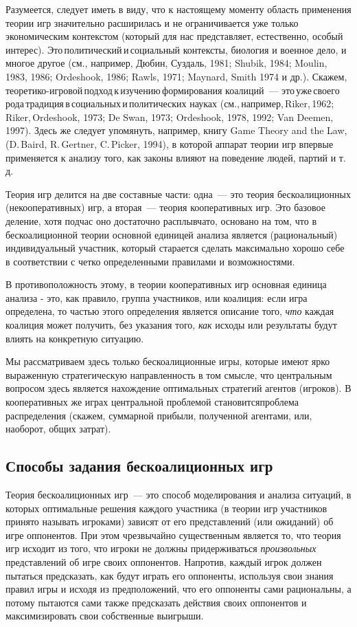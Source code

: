 \documentclass[12pt]{article}
\begin{document}
Разумеется, следует иметь в виду, что к настоящему моменту область
применения теории игр значительно расширилась и не ограничивается
уже только экономическим контекстом (который для нас представляет,
естественно, особый
интерес). Это\,политический\,и\,социальный контексты, биология и
военное дело, и многое другое (см., например, Дюбин, Суздаль, 1981;
Shubik, 1984; Moulin, 1983, 1986; Ordeshook, 1986; Rawls, 1971;
Maynard, Smith 1974 и др.).
Скажем,\,теоретико-игровой\,подход\,к\,изучению\,фор\-ми\-ро\-ва\-ния
коалиций~---
это\,уже\,своего\,рода\,традиция\,в\,социальных\,и\,по\-ли\-тических
науках (см.,\,например,\,Riker,\,1962;\,Riker,\,Or\-des\-hook, 1973;
De Swan, 1973; Or\-des\-hook, 1978, 1992; Van Deemen, 1997). Здесь
же следует упомянуть, например, книгу Game Theory and the Law,
(D.\,Baird, R.\,Gertner, C.\,Picker, 1994), в которой аппарат теории
игр впервые применяется к анализу того, как законы влияют на
поведение людей, партий и т.\,д.
\smallskip

Теория игр делится на две составные части: одна~--- это теория
бескоалиционных (некооперативных) игр, а вторая~--- теория
кооперативных игр. Это базовое деление, хотя подчас оно достаточно
расплывчато, основано на том, что в бескоалиционной теории основной
единицей анализа является (рациональный) индивидуальный участник,
который старается сделать максимально хорошо себе в соответствии с
четко определенными правилами и возможностями.

В противоположность этому, в теории кооперативных игр основная
единица анализа - это, как правило, группа участников, или коалиция:
если игра определена, то частью этого определения является описание
того, \emph{что} каждая коалиция может получить, без указания того,
\emph{как} исходы или результаты будут влиять на конкретную
ситуацию.

Мы рассматриваем здесь только бескоалиционные игры, которые имеют
ярко выраженную стратегическую направленность в том смысле, что
центральным вопросом здесь является нахождение оптимальных
стратегий агентов (игроков). В кооперативных же играх центральной
проблемой становитсяпроблема распределения (скажем, суммарной прибыли,
полученной агентами, или, наоборот, общих затрат).

\subsection{Способы задания бескоалиционных игр}


Теория бескоалиционных игр~--- это способ моделирования и анализа
ситуаций, в которых оптимальные решения каждого участника (в теории
игр участников принято называть  игроками) зависят от его
представлений (или ожиданий) об игре оппонентов. При этом чрезвычайно
существенным является то, что теория игр исходит из того, что
игроки не должны придерживаться
{\it произвольных} представлений об игре своих оппонентов. Напротив,
каждый игрок должен пытаться предсказать, как будут играть его оппоненты,
используя свои знания правил игры и исходя из предположений, что его
оппоненты сами рациональны, а потому пытаются сами также предсказать
действия своих оппонентов и максимизировать свои собственные выигрыши.
\end{document}

